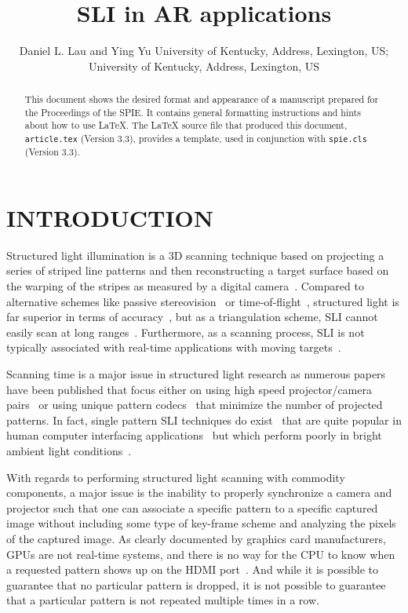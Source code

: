 \documentclass[]{spie}  %
\title{SLI in AR applications}
\author{Daniel L. Lau\supit{a} and Ying Yu\supit{b}
\skiplinehalf
\supit{a}University of Kentucky, Address, Lexington, US; \\
\supit{b}University of Kentucky, Address, Lexington, US
}
\begin{document}
 
  \maketitle 

\begin{abstract}
This document shows the desired format and appearance of a manuscript prepared for the Proceedings of the SPIE.  It contains general formatting instructions and hints about how to use LaTeX.  The LaTeX source file that produced this document, {\tt article.tex} (Version 3.3), provides a template, used in conjunction with {\tt spie.cls} (Version 3.3).  
\end{abstract}



\section{INTRODUCTION}
\label{sec:intro}  %
Structured light illumination is a 3D scanning technique based on projecting a series of striped line patterns and then reconstructing a target surface based on the warping of the stripes as measured by a digital camera~\cite{lieb05}.  Compared to alternative schemes like passive stereovision~\cite{curl96} or time-of-flight~\cite{gokt04}, structured light is far superior in terms of accuracy~\cite{lijl03}, but as a triangulation scheme, SLI cannot easily scan at long ranges~\cite{anyt16}.  Furthermore, as a scanning process, SLI is not typically associated with real-time applications with moving targets~\cite{deet17}.

Scanning time is a major issue in structured light research as numerous papers have been published that focus either on using high speed projector/camera pairs~\cite{gong10} or using unique pattern codecs~\cite{zhan04, suwh06,liuk10} that minimize the number of projected patterns. In fact, single pattern SLI techniques do exist~\cite{take83, wust91, koni06} that are quite popular in human computer interfacing applications~\cite{guan05} but which perform poorly in bright ambient light conditions~\cite{yuan12}. 

With regards to performing structured light scanning with commodity components, a major issue is the inability to properly synchronize a camera and projector such that one can associate a specific pattern to a specific captured image without including some type of key-frame scheme and analyzing the pixels of the captured image. As clearly documented by graphics card manufacturers, GPUs are not real-time systems, and there is no way for the CPU to know when a requested pattern shows up on the HDMI port~\cite{nvid18}. And while it is possible to guarantee that no particular pattern is dropped, it is not possible to guarantee that a particular pattern is not repeated multiple times in a row.
\end{document}

